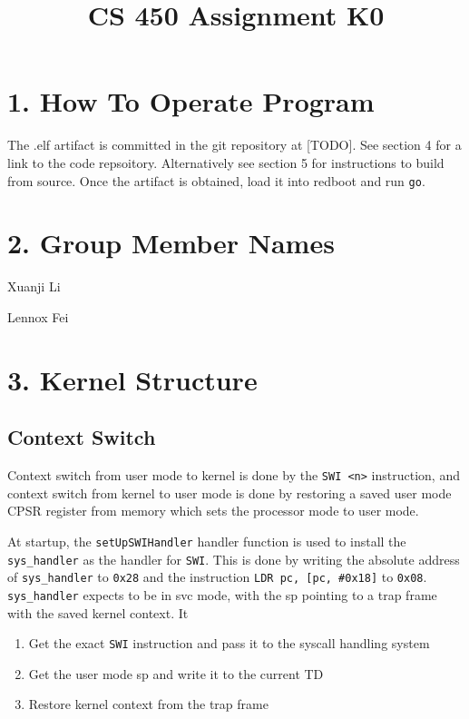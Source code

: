 \documentclass{article}
\title{CS 450 Assignment K0}
\date{}
\begin{document}
\maketitle


\section*{1. How To Operate Program}

The .elf artifact is committed in the git repository at [TODO]. See section 4 for a link to the code repsoitory. Alternatively see section 5 for instructions to build from source. Once the artifact is obtained, load it into redboot and run \texttt{go}.

\section*{2. Group Member Names}

Xuanji Li

Lennox Fei

\section*{3. Kernel Structure}

\subsection*{Context Switch}

Context switch from user mode to kernel is done by the \texttt{SWI <n>} instruction, and context switch from kernel to user mode is done by restoring a saved user mode CPSR register from memory which sets the processor mode to user mode.

At startup, the \texttt{setUpSWIHandler} handler function is used to install the \texttt{sys\_handler} as the handler for \texttt{SWI}. This is done by writing the absolute address of \texttt{sys\_handler} to \texttt{0x28} and the instruction \texttt{LDR pc, [pc, \#0x18]} to \texttt{0x08}. \texttt{sys\_handler} expects to be in svc mode, with the sp pointing to a trap frame with the saved kernel context. It

\begin{enumerate}
\item Get the exact \texttt{SWI} instruction and pass it to the syscall handling system
\item Get the user mode sp and write it to the current TD
\item Restore kernel context from the trap frame
\end{enumerate}
\end{document}
